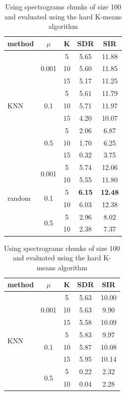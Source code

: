 \documentclass[master, tikz, final,11pt, dvipdfmx]{iscs-thesis}
\begin{document}
\begin{table}[h!]
\begin{subtable}{.5\linewidth}
\centering
\begin{tabular}{l|c|c|c|c}
method & $\mu$ & K & SDR & SIR \\ 
\hline
\multirow{9}{*}{KNN}  & \multirow{3}{*}{0.001} & 5 & 5.65 & 11.88 \\ 
 &  & 10 & 5.60 & 11.85 \\
 &  & 15 & 5.17 & 11.25 \\
\cline{2-5}
 & \multirow{3}{*}{0.1} & 5 & 5.61 & 11.79 \\
 &  & 10 & 5.71 & 11.97 \\
 &  & 15 & 4.20 & 10.07 \\
\cline{2-5}
 & \multirow{3}{*}{0.5} & 5 & 2.06 & 6.87 \\
 &  & 10 & 1.70 & 6.25 \\
 &  & 15 & 0.32 & 3.75 \\
\hline
\multirow{6}{*}{random}  & \multirow{2}{*}{0.001} & 5 & 5.74 & 12.06 \\ 
 &  & 10 & 5.55 & 11.80 \\
\cline{2-5}
 & \multirow{2}{*}{0.1} & 5 & \cellcolor{green}\textbf{6.15} & \cellcolor{green}\textbf{12.48} \\
 &  & 10 & 6.03 & 12.38 \\
\cline{2-5}
 & \multirow{2}{*}{0.5} & 5 & 2.96 & 8.02 \\
 &  & 10 & 2.38 & 7.37 \\
\hline
\end{tabular}
\caption{Using spectrograms chunks of size 100 and evaluated using the hard K-means algorithm}
\label{table:SCE100NS}
\end{subtable}%
\begin{subtable}{.5\linewidth}
\centering
\begin{tabular}{l|c|c|c|c}
method & $\mu$ & K & SDR & SIR \\ 
\hline
\multirow{9}{*}{KNN}  & \multirow{3}{*}{0.001} & 5 & 5.63 & 10.00 \\ 
 &  & 10 & 5.63 & 9.90 \\
 &  & 15 & 5.58 & 10.09 \\
\cline{2-5}
 & \multirow{3}{*}{0.1} & 5 & 5.83 & 9.97 \\
 &  & 10 & 5.87 & 10.08 \\
 &  & 15 & 5.95 & 10.14 \\
\cline{2-5}
 & \multirow{3}{*}{0.5} & 5 & 0.22 & 2.32 \\
 &  & 10 & 0.04 & 2.28 \\

\end{tabular}
\end{subtable}
\end{table}
\end{document}
